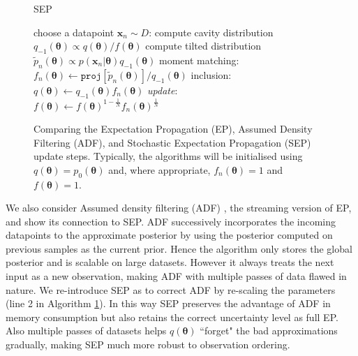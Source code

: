 \begin{figure}[!t]
\begin{minipage}[t]{0.33\linewidth}
\begin{algorithm}[H]
\begin{algorithmic}[1]
\end{algorithmic}
\end{algorithm}
\end{minipage}
\begin{minipage}[t]{0.33\linewidth}
\centering
\begin{algorithm}[H]
\caption{SEP} \small
\label{alg:sep} 
\begin{algorithmic}[1] 
	\STATE choose a datapoint $\bm{x}_n\sim D$:
	\STATE compute cavity distribution \\ $q_{-1}(\bm{\theta}) \propto q(\bm{\theta}) / f(\bm{\theta})$
	\STATE compute tilted distribution \\$\tilde{p}_n(\bm{\theta}) \propto p(\bm{x}_n|\bm{\theta}) q_{-1}(\bm{\theta})$
	\STATE moment matching: \\\hspace{-1mm}$f_n(\bm{\theta}) \leftarrow \mathtt{proj}[\tilde{p}_n(\bm{\theta})] / q_{-1}(\bm{\theta}) $
	\STATE inclusion:\\ $q(\bm{\theta}) \leftarrow q_{-1}(\bm{\theta}) f_n(\bm{\theta})$
	\STATE \textit{update}:\\ $f(\bm{\theta}) \leftarrow f(\bm{\theta})^{1 - \frac{1}{N}} f_n(\bm{\theta})^{\frac{1}{N}}$
\end{algorithmic}
\end{algorithm}
\end{minipage} 
%
\caption{Comparing the Expectation Propagation (EP), Assumed Density Filtering (ADF), and Stochastic Expectation Propagation (SEP) update steps. Typically, the algorithms will be initialised using $q(\mathbf{\theta}) = p_0(\mathbf{\theta})$ and, where appropriate, $f_n(\mathbf{\theta})=1$ and $f(\mathbf{\theta})=1$.}
\end{figure}

%
We also consider Assumed density filtering (ADF) \cite{maybeck:adf}\cite{minka:ep}, the streaming version of EP, and show its connection to SEP. ADF successively incorporates the incoming datapoints to the approximate posterior by using the posterior computed on previous samples as the current prior. Hence the algorithm only stores the global posterior and is scalable on large datasets. However it always treats the next input as a new observation, making ADF with multiple passes of data flawed in nature. 
%
We re-introduce SEP as to correct ADF by re-scaling the parameters (line 2 in Algorithm \ref{alg:sep}). In this way SEP preserves the advantage of ADF in memory consumption but also retains the correct uncertainty level as full EP. Also multiple passes of datasets helps $q(\bm{\theta})$ ``forget" the bad approximations gradually, making SEP much more robust to observation ordering. 